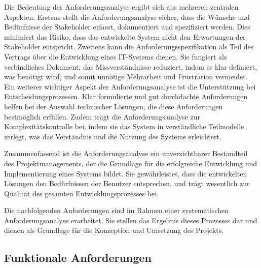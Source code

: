 Die Bedeutung der Anforderungsanalyse ergibt sich aus mehreren zentralen Aspekten.
 Erstens stellt die Anforderungsanalyse sicher, dass die Wünsche und Bedürfnisse der
 Stakeholder erfasst, dokumentiert und spezifiziert werden. Dies minimiert das Risiko, dass
 das entwickelte System nicht den Erwartungen der Stakeholder entspricht. Zweitens kann
 die Anforderungsspezifikation als Teil des Vertrags über die Entwicklung eines IT-Systems
 dienen. Sie fungiert als verbindliches Dokument, das Missverständnisse reduziert, indem
 es klar definiert, was benötigt wird, und somit unnötige Mehrarbeit und Frustration
 vermeidet. Ein weiterer wichtiger Aspekt der Anforderungsanalyse ist die Unterstützung
 bei Entscheidungsprozessen. Klar formulierte und gut durchdachte Anforderungen helfen
 bei der Auswahl technischer Lösungen, die diese Anforderungen bestmöglich erfüllen.
 Zudem trägt die Anforderungsanalyse zur Komplexitätskontrolle bei, indem sie das System
 in verständliche Teilmodelle zerlegt, was das Verständnis und die Nutzung des Systems
 erleichtert. \cite[Vgl.][S. 83-84]{Sommerville} \cite[Vgl.][S. 55-70]{Kleuker} \cite[Vgl.][S. 55-70]{Herrmann} \cite[Vgl.][S. 55-70]{Meyer} 

Zusammenfassend ist die Anforderungsanalyse ein unverzichtbarer Bestandteil des Projektmanagements, der die Grundlage für die erfolgreiche Entwicklung und Implementierung eines Systems bildet. Sie gewährleistet, dass die entwickelten Lösungen den Bedürfnissen der Benutzer entsprechen, und trägt wesentlich zur Qualität des gesamten Entwicklungsprozesses bei.

Die nachfolgenden Anforderungen sind im Rahmen einer systematischen Anforderungsanalyse erarbeitet. Sie stellen das Ergebnis dieses Prozesses dar und dienen als Grundlage für die Konzeption und Umsetzung des Projekts.

\subsection{Funktionale Anforderungen} \label{f_Anforderungen}
